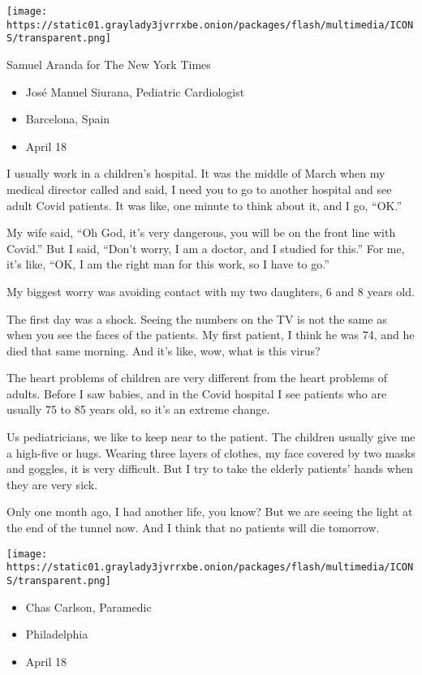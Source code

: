 \texttt{[image: https://static01.graylady3jvrrxbe.onion/packages/flash/multimedia/ICONS/transparent.png]}

Samuel Aranda for The New York Times

\begin{itemize}
\tightlist
\item
  José Manuel Siurana, Pediatric Cardiologist
\item
  Barcelona, Spain
\item
  April 18
\end{itemize}

I usually work in a children's hospital. It was the middle of March when
my medical director called and said, I need you to go to another
hospital and see adult Covid patients. It was like, one minute to think
about it, and I go, ``OK.''

My wife said, ``Oh God, it's very dangerous, you will be on the front
line with Covid.'' But I said, ``Don't worry, I am a doctor, and I
studied for this.'' For me, it's like, ``OK, I am the right man for this
work, so I have to go.''

My biggest worry was avoiding contact with my two daughters, 6 and 8
years old.

The first day was a shock. Seeing the numbers on the TV is not the same
as when you see the faces of the patients. My first patient, I think he
was 74, and he died that same morning. And it's like, wow, what is this
virus?

The heart problems of children are very different from the heart
problems of adults. Before I saw babies, and in the Covid hospital I see
patients who are usually 75 to 85 years old, so it's an extreme change.

Us pediatricians, we like to keep near to the patient. The children
usually give me a high-five or hugs. Wearing three layers of clothes, my
face covered by two masks and goggles, it is very difficult. But I try
to take the elderly patients' hands when they are very sick.

Only one month ago, I had another life, you know? But we are seeing the
light at the end of the tunnel now. And I think that no patients will
die tomorrow.

\texttt{[image: https://static01.graylady3jvrrxbe.onion/packages/flash/multimedia/ICONS/transparent.png]}

\begin{itemize}
\tightlist
\item
  Chas Carlson, Paramedic
\item
  Philadelphia
\item
  April 18
\end{itemize}

